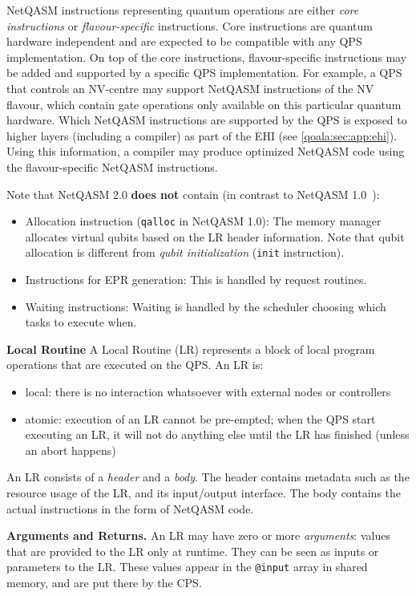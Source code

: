 NetQASM instructions representing quantum operations are either \textit{core instructions} or \textit{flavour-specific} instructions.
Core instructions are quantum hardware independent and are expected to be compatible with any QPS implementation. On top of the core instructions, flavour-specific instructions may be added and supported by a specific QPS implementation. For example, a QPS that controls an NV-centre may support NetQASM instructions of the NV flavour, which contain gate operations only available on this particular quantum hardware. Which NetQASM instructions are supported by the QPS is exposed to higher layers (including a compiler) as part of the EHI (see \cref{qoala:sec:app:ehi}). Using this information, a compiler may produce optimized NetQASM code using the flavour-specific NetQASM instructions.


Note that NetQASM 2.0 \textbf{does not} contain (in contrast to NetQASM 1.0~\cite{dahlberg2022netqasm}):
\begin{itemize}
\item Allocation instruction (\texttt{qalloc} in NetQASM 1.0): The memory manager allocates virtual qubits based on the LR header information. Note that qubit allocation is different from \textit{qubit initialization} (\texttt{init} instruction).
\item Instructions for EPR generation: This is handled by request routines.
\item Waiting instructions: Waiting is handled by the scheduler choosing which tasks to execute when.
\end{itemize}

\textbf{Local Routine}
A Local Routine (LR) represents a block of local program operations that are executed on the QPS. An LR is:
\begin{itemize}
\item local: there is no interaction whatsoever with external nodes or controllers
\item atomic: execution of an LR cannot be pre-empted; when the QPS start executing an LR, it will not do anything else until the LR has finished (unless an abort happens)
\end{itemize}

An LR consists of a \textit{header} and a \textit{body}. The header contains metadata such as the resource usage of the LR, and its input/output interface. The body contains the actual instructions in the form of NetQASM code.


\textbf{Arguments and Returns.}
An LR may have zero or more \textit{arguments}: values that are provided to the LR only at runtime.
They can be seen as inputs or parameters to the LR.
These values appear in the \texttt{@input} array in shared memory, and are put there by the CPS.

